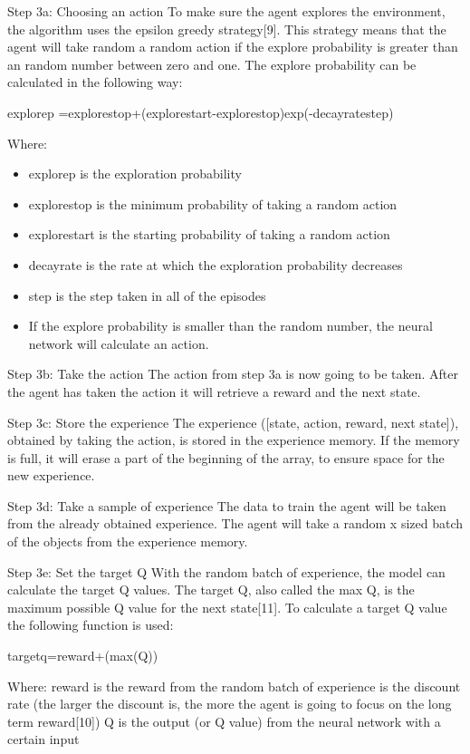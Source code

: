 \documentclass{article}
\begin{document}
\begin{flushleft}
Step 3a: Choosing an action 
To make sure the agent explores the environment, the algorithm uses the epsilon greedy strategy[9]. This strategy means that the agent will take random a random action if the explore probability is greater than an random number between zero and one. The explore probability can be calculated in the following way: 

explorep =explorestop+(explorestart-explorestop)exp(-decayratestep)
\newline

Where:
\begin{itemize}
\item explorep is the exploration probability 
\item explorestop is the minimum probability of taking a random action
\item explorestart is the starting probability of taking a random action
\item decayrate is the rate at which the exploration probability decreases
\item step is the step taken in all of the episodes
\item If the explore probability is smaller than the random number, the neural network will calculate an action.
\end{itemize}
\end{flushleft}

\begin{flushleft}
Step 3b: Take the action
The action from step 3a is now going to be taken. After the agent has taken the action it will retrieve a reward and the next state. 
\end{flushleft}

\begin{flushleft}
Step 3c: Store the experience
The experience ([state, action, reward, next state]), obtained by taking the action, is stored in the experience memory. If the memory is full, it will erase a part of the beginning of the array, to ensure space for the new experience.
\end{flushleft}

\begin{flushleft}
Step 3d: Take a sample of experience
The data to train the agent will be taken from the already obtained experience. The agent will take a random x sized batch of the objects from the experience memory. 
\end{flushleft}

\begin{flushleft}
Step 3e: Set the target Q
With the random batch of experience, the model can calculate the target Q values. The target Q, also called the max Q, is the maximum possible Q value for the next state[11]. To calculate a target Q value the following function is used:

targetq=reward+(max(Q))

Where:
reward is the reward from the random batch of experience
is the discount rate (the larger the discount is, the more the agent is going to focus on the long term reward[10])
Q is the output (or Q value) from the neural network with a certain input
\end{flushleft} 
\end{document}
